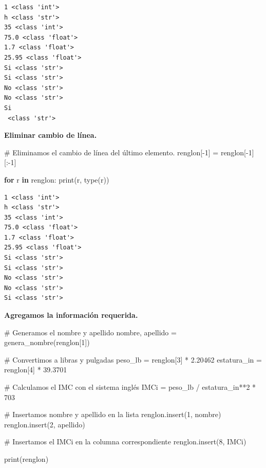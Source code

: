 \documentclass[
  spanish,
  letterpaper,
]{scrbook}
\newenvironment{Shaded}{\begin{snugshade}}{\end{snugshade}}
\newcommand{\BuiltInTok}[1]{\textcolor[rgb]{0.00,0.23,0.31}{#1}}
\newcommand{\CommentTok}[1]{\textcolor[rgb]{0.37,0.37,0.37}{#1}}
\newcommand{\ControlFlowTok}[1]{\textcolor[rgb]{0.00,0.23,0.31}{\textbf{#1}}}
\newcommand{\DecValTok}[1]{\textcolor[rgb]{0.68,0.00,0.00}{#1}}
\newcommand{\FloatTok}[1]{\textcolor[rgb]{0.68,0.00,0.00}{#1}}
\newcommand{\KeywordTok}[1]{\textcolor[rgb]{0.00,0.23,0.31}{\textbf{#1}}}
\newcommand{\NormalTok}[1]{\textcolor[rgb]{0.00,0.23,0.31}{#1}}
\newcommand{\OperatorTok}[1]{\textcolor[rgb]{0.37,0.37,0.37}{#1}}
\theoremstyle{definition}
\theoremstyle{remark}
\begin{document}
\begin{verbatim}
1 <class 'int'>
h <class 'str'>
35 <class 'int'>
75.0 <class 'float'>
1.7 <class 'float'>
25.95 <class 'float'>
Si <class 'str'>
Si <class 'str'>
No <class 'str'>
No <class 'str'>
Si
 <class 'str'>
\end{verbatim}

\textbf{Eliminar cambio de línea.}

\begin{Shaded}
\begin{Highlighting}[]
\CommentTok{\# Eliminamos el cambio de línea del último elemento.}
\NormalTok{renglon[}\OperatorTok{{-}}\DecValTok{1}\NormalTok{] }\OperatorTok{=}\NormalTok{ renglon[}\OperatorTok{{-}}\DecValTok{1}\NormalTok{][:}\OperatorTok{{-}}\DecValTok{1}\NormalTok{]}

\ControlFlowTok{for}\NormalTok{ r }\KeywordTok{in}\NormalTok{ renglon:}
    \BuiltInTok{print}\NormalTok{(r, }\BuiltInTok{type}\NormalTok{(r))}
\end{Highlighting}
\end{Shaded}

\begin{verbatim}
1 <class 'int'>
h <class 'str'>
35 <class 'int'>
75.0 <class 'float'>
1.7 <class 'float'>
25.95 <class 'float'>
Si <class 'str'>
Si <class 'str'>
No <class 'str'>
No <class 'str'>
Si <class 'str'>
\end{verbatim}

\textbf{Agregamos la información requerida.}

\begin{Shaded}
\begin{Highlighting}[]
\CommentTok{\# Generamos el nombre y apellido}
\NormalTok{nombre, apellido }\OperatorTok{=}\NormalTok{ genera\_nombre(renglon[}\DecValTok{1}\NormalTok{])}

\CommentTok{\# Convertimos a libras y pulgadas}
\NormalTok{peso\_lb }\OperatorTok{=}\NormalTok{ renglon[}\DecValTok{3}\NormalTok{] }\OperatorTok{*} \FloatTok{2.20462}
\NormalTok{estatura\_in }\OperatorTok{=}\NormalTok{ renglon[}\DecValTok{4}\NormalTok{] }\OperatorTok{*} \FloatTok{39.3701}

\CommentTok{\# Calculamos el IMC con el sistema inglés}
\NormalTok{IMCi }\OperatorTok{=}\NormalTok{ peso\_lb }\OperatorTok{/}\NormalTok{ estatura\_in}\OperatorTok{**}\DecValTok{2} \OperatorTok{*} \DecValTok{703}

\CommentTok{\# Insertamos nombre y apellido en la lista}
\NormalTok{renglon.insert(}\DecValTok{1}\NormalTok{, nombre)}
\NormalTok{renglon.insert(}\DecValTok{2}\NormalTok{, apellido)}

\CommentTok{\# Insertamos el IMCi en la columna correspondiente}
\NormalTok{renglon.insert(}\DecValTok{8}\NormalTok{, IMCi)}

\BuiltInTok{print}\NormalTok{(renglon)}
\end{Highlighting}
\end{Shaded}
\end{document}
